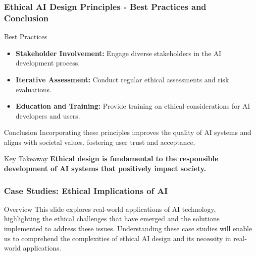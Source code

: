 \documentclass[aspectratio=169]{beamer}
\begin{document}
\begin{frame}[fragile]
    \frametitle{Ethical AI Design Principles - Best Practices and Conclusion}
    \begin{block}{Best Practices}
        \begin{itemize}
            \item \textbf{Stakeholder Involvement:} Engage diverse stakeholders in the AI development process.
            \item \textbf{Iterative Assessment:} Conduct regular ethical assessments and risk evaluations.
            \item \textbf{Education and Training:} Provide training on ethical considerations for AI developers and users.
        \end{itemize}
    \end{block}

    \begin{block}{Conclusion}
        Incorporating these principles improves the quality of AI systems and aligns with societal values, fostering user trust and acceptance. 
    \end{block}
    
    \begin{block}{Key Takeaway}
        \textbf{Ethical design is fundamental to the responsible development of AI systems that positively impact society.}
    \end{block}
\end{frame}

\begin{frame}[fragile]
    \frametitle{Case Studies: Ethical Implications of AI}
    \begin{block}{Overview}
        This slide explores real-world applications of AI technology, highlighting the ethical challenges that have emerged and the solutions implemented to address these issues. Understanding these case studies will enable us to comprehend the complexities of ethical AI design and its necessity in real-world applications.
    \end{block}
\end{frame}
\end{document}
